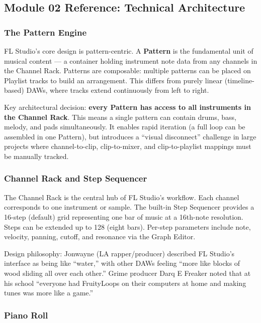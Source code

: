 \documentclass[11pt,letterpaper]{article}
\begin{document}
\subsection{Module 02 Reference: Technical Architecture}

\subsubsection{The Pattern Engine}

FL Studio's core design is pattern-centric. A \textbf{Pattern} is the fundamental unit of musical content --- a container holding instrument note data from any channels in the Channel Rack. Patterns are composable: multiple patterns can be placed on Playlist tracks to build an arrangement. This differs from purely linear (timeline-based) DAWs, where tracks extend continuously from left to right.

Key architectural decision: \textbf{every Pattern has access to all instruments in the Channel Rack}. This means a single pattern can contain drums, bass, melody, and pads simultaneously. It enables rapid iteration (a full loop can be assembled in one Pattern), but introduces a ``visual disconnect'' challenge in large projects where channel-to-clip, clip-to-mixer, and clip-to-playlist mappings must be manually tracked.

\subsubsection{Channel Rack and Step Sequencer}

The Channel Rack is the central hub of FL Studio's workflow. Each channel corresponds to one instrument or sample. The built-in Step Sequencer provides a 16-step (default) grid representing one bar of music at a 16th-note resolution. Steps can be extended up to 128 (eight bars). Per-step parameters include note, velocity, panning, cutoff, and resonance via the Graph Editor.

Design philosophy: Jonwayne (LA rapper/producer) described FL Studio's interface as being like ``water,'' with other DAWs feeling ``more like blocks of wood sliding all over each other.'' Grime producer Darq E Freaker noted that at his school ``everyone had FruityLoops on their computers at home and making tunes was more like a game.''

\subsubsection{Piano Roll}
\end{document}
